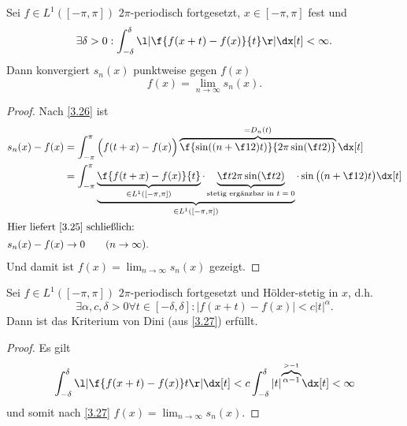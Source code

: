\begin{st} \label{3.27}
	Sei $f \in L^1([-\pi,\pi])$ $2\pi$-periodisch fortgesetzt, $x \in [-\pi,\pi]$ fest und
	\[
		\exists \delta > 0 : \int_{-\delta}^{\delta} \l| \f{f(x+t)-f(x)}{t} \r| \dx[t] < \infty.
	\]
	Dann konvergiert $s_n(x)$ punktweise gegen $f(x)$
	\[
		f(x) = \lim_{n\to\infty} s_n(x).
	\]
	\begin{proof}
		Nach \ref{3.26} ist
		\begin{align*}
			s_n(x)-f(x)
			&= \int_{-\pi}^\pi \Big( f(t+x)-f(x) \Big) \overbrace{\f {\sin((n+\f 12) t)}{2\pi \sin(\f t2)}}^{=D_n(t)}  \dx[t] \\
			&= \int_{-\pi}^\pi \underbrace{\underbrace{\f {f(t+x)-f(x)}{t}}_{\in L^1([-\pi,\pi])} \cdot 
		\underbrace{\f t{2\pi \sin(\f t2)}}_{\text{stetig ergänzbar in $t=0$}}}_{\in L^1([-\pi,\pi])} \cdot \sin\big((n+\f 12) t\big) \dx[t] \\
			\intertext{Hier liefert \ref{3.25} schließlich:}
			s_n(x)-f(x)&\to 0 \qquad (n\to \infty).
		\end{align*}
		Und damit ist $f(x)=\lim_{n\to \infty} s_n(x)$ gezeigt.
	\end{proof}
\end{st}

\begin{nt} \label{3.28}
	Sei $f \in L^1([-\pi,\pi])$ $2\pi$-periodisch fortgesetzt und Hölder-stetig in $x$, d.h.
	\[
		\exists \alpha, c, \delta > 0 \forall t \in [-\delta, \delta] : |f(x+t) - f(x)| < c |t|^\alpha.
	\]
	Dann ist das Kriterium von Dini (aus \ref{3.27}) erfüllt.
	\begin{proof}
		Es gilt
		\[
			\int_{-\delta}^{\delta} \l| \f{f(x+t) - f(x)}t \r| \dx[t] 
			< c \int_{-\delta}^\delta |t|^{\overbrace{\scriptstyle\alpha - 1}^{\scriptscriptstyle >-1}} \dx[t]
			< \infty
		\]
		und somit nach \ref{3.27} $f(x) = \lim_{n\to\infty} s_n(x)$.
	\end{proof}
\end{nt}

